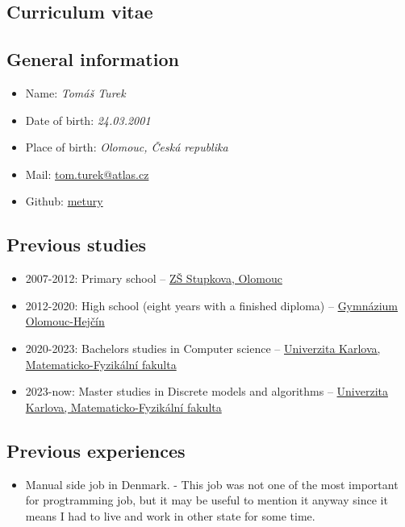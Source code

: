 \documentclass{article}
\begin{document}
\begin{center}
\section*{Curriculum vitae}
\end{center}

\subsection*{General information}

\begin{itemize}
	\item Name: \textit{Tomáš Turek}
	\item Date of birth: \textit{24.03.2001}
	\item Place of birth: \textit{Olomouc, Česká republika}
	\item Mail: \href{mailto:tom.turek@atlas.cz}{tom.turek@atlas.cz}
	\item Github: \href{https://github.com/metury}{metury}
\end{itemize}

\subsection*{Previous studies}

\begin{itemize}
	\item 2007-2012: Primary school -- \href{https://zsstupkova.cz/}{ZŠ Stupkova, Olomouc}
	\item 2012-2020: High school (eight years with a finished diploma) -- \href{https://www.gytool.cz/}{Gymnázium Olomouc-Hejčín}
	\item 2020-2023: Bachelors studies in Computer science -- \href{https://www.mff.cuni.cz/}{Univerzita Karlova, Matematicko-Fyzikální fakulta}
	\item 2023-now: Master studies in Discrete models and algorithms -- \href{https://www.mff.cuni.cz/}{Univerzita Karlova, Matematicko-Fyzikální fakulta}
\end{itemize}

\subsection*{Previous experiences}

\begin{itemize}
	\item Manual side job in Denmark. - This job was not one of the most important for progtramming job, but it may be useful to mention it anyway since it means I had to live and work in other state for some time.
\end{itemize}
\end{document}
